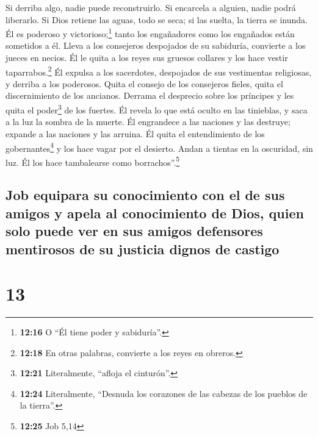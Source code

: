  Si derriba algo, nadie puede reconstruirlo. Si encarcela
a alguien, nadie podrá liberarlo.  Si Dios retiene las
aguas, todo se seca; si las suelta, la tierra se inunda. 
Él es poderoso y victorioso;\footnote{\textbf{12:16} O ``Él tiene poder
  y sabiduría''.} tanto los engañadores como los engañados están
sometidos a él.  Lleva a los consejeros despojados de su
sabiduría, convierte a los jueces en necios.  Él le quita
a los reyes sus gruesos collares y los hace vestir
taparrabos.\footnote{\textbf{12:18} En otras palabras, convierte a los
  reyes en obreros.}  Él expulsa a los sacerdotes,
despojados de sus vestimentas religiosas, y derriba a los poderosos.
 Quita el consejo de los consejeros fieles, quita el
discernimiento de los ancianos.  Derrama el desprecio
sobre los príncipes y les quita el poder\footnote{\textbf{12:21}
  Literalmente, ``afloja el cinturón''.} de los fuertes. 
Él revela lo que está oculto en las tinieblas, y saca a la luz la sombra
de la muerte.  Él engrandece a las naciones y las
destruye; expande a las naciones y las arruina.  Él quita
el entendimiento de los gobernantes\footnote{\textbf{12:24}
  Literalmente, ``Desnuda los corazones de las cabezas de los pueblos de
  la tierra''.} y los hace vagar por el desierto.  Andan
a tientas en la oscuridad, sin luz. Él los hace tambalearse como
borrachos''.\footnote{\textbf{12:25} Job 5,14}

\hypertarget{job-equipara-su-conocimiento-con-el-de-sus-amigos-y-apela-al-conocimiento-de-dios-quien-solo-puede-ver-en-sus-amigos-defensores-mentirosos-de-su-justicia-dignos-de-castigo}{%
\subsection{Job equipara su conocimiento con el de sus amigos y apela al
conocimiento de Dios, quien solo puede ver en sus amigos defensores
mentirosos de su justicia dignos de
castigo}\label{job-equipara-su-conocimiento-con-el-de-sus-amigos-y-apela-al-conocimiento-de-dios-quien-solo-puede-ver-en-sus-amigos-defensores-mentirosos-de-su-justicia-dignos-de-castigo}}

\hypertarget{section-12}{%
\section{13}\label{section-12}}


